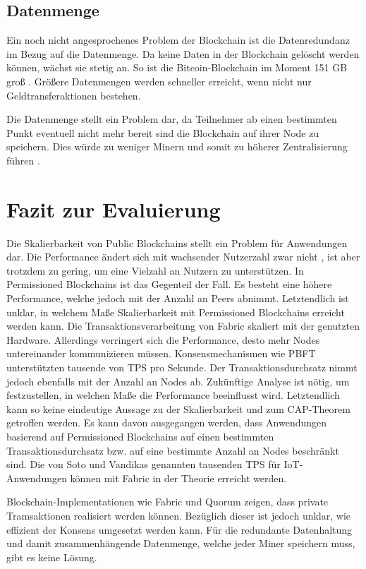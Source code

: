 \subsection{Datenmenge}
Ein noch nicht angesprochenes Problem der Blockchain ist die Datenredundanz im Bezug auf die Datenmenge. Da keine Daten in der Blockchain gelöscht werden können, wächst sie stetig an. So ist die Bitcoin-Blockchain im Moment 151 GB groß \cite{BlockchainUnternehmenBlockchainSizeBitcoin}. Größere Datenmengen werden schneller erreicht, wenn nicht nur Geldtransferaktionen bestehen.

Die Datenmenge stellt ein Problem dar, da Teilnehmer ab einen bestimmten Punkt eventuell nicht mehr bereit sind die Blockchain auf ihrer Node zu speichern. Dies würde zu weniger Minern und somit zu höherer Zentralisierung führen \cite{SchererPerformanceScalabilityBlockchain2017}.

\section{Fazit zur Evaluierung}
Die Skalierbarkeit von Public Blockchains stellt ein Problem für Anwendungen dar. Die Performance ändert sich mit wachsender Nutzerzahl zwar nicht \cite{SchererPerformanceScalabilityBlockchain2017}, ist aber trotzdem zu gering, um eine Vielzahl an Nutzern zu unterstützen. In Permissioned Blockchains ist das Gegenteil der Fall. Es besteht eine höhere Performance, welche jedoch mit der Anzahl an Peers abnimmt. Letztendlich ist unklar, in welchem Maße Skalierbarkeit mit Permissioned Blockchains erreicht werden kann. Die Transaktionsverarbeitung von Fabric skaliert mit der genutzten Hardware. Allerdings verringert sich die Performance, desto mehr Nodes untereinander kommunizieren müssen. Konsensmechanismen wie \acs{PBFT} unterstützten tausende von \acs{TPS} pro Sekunde. Der Transaktionsdurchsatz nimmt jedoch ebenfalls mit der Anzahl an Nodes ab. Zukünftige Analyse ist nötig, um festzustellen, in welchen Maße die Performance beeinflusst wird. Letztendlich kann so keine eindeutige Aussage zu der Skalierbarkeit und zum CAP-Theorem getroffen werden. Es kann davon ausgegangen werden, dass Anwendungen basierend auf Permissioned Blockchains auf einen bestimmten Transaktionsdurchsatz bzw. auf eine bestimmte Anzahl an Nodes beschränkt sind. Die von Soto und Vandikas genannten tausenden \acs{TPS} für IoT-Anwendungen können mit Fabric in der Theorie erreicht werden. 

Blockchain-Implementationen wie Fabric und Quorum zeigen, dass private Tramsaktionen realisiert werden können. Bezüglich dieser ist jedoch unklar, wie effizient der Konsens umgesetzt werden kann. Für die redundante Datenhaltung und damit zusammenhängende Datenmenge, welche jeder Miner speichern muss, gibt es keine Lösung.





